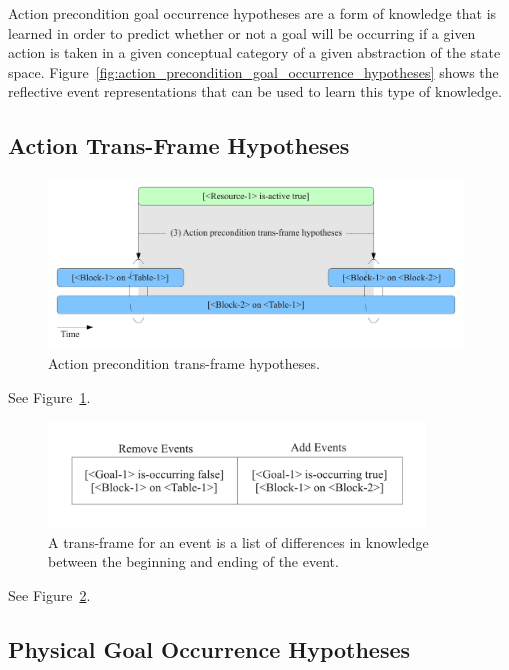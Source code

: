 Action precondition goal occurrence hypotheses are a form of knowledge
that is learned in order to predict whether or not a goal will be
occurring if a given action is taken in a given conceptual category of
a given abstraction of the state space.
Figure~\ref{fig:action_precondition_goal_occurrence_hypotheses} shows
the reflective event representations that can be used to learn this
type of knowledge.

\subsection{Action Trans-Frame Hypotheses}
\label{sec:learning_trans_frames_for_events}

\begin{figure}[bth]
  \center
  \includegraphics[width=11cm]{gfx/learning_to_plan-3-action_precondition_transframe_hypotheses}
  \caption[Action precondition trans-frame hypotheses]{Action precondition trans-frame hypotheses.}
  \label{fig:action_precondition_transframe_hypotheses}
\end{figure}

See Figure~\ref{fig:action_precondition_transframe_hypotheses}.

\begin{figure}[bth]
  \center
  \includegraphics[width=10cm]{gfx/transframe}
  \caption[A trans-frame for an event]{A trans-frame for an event is a
    list of differences in knowledge between the beginning and ending
    of the event.}
  \label{fig:transframe}
\end{figure}

See Figure~\ref{fig:transframe}.



\subsection{Physical Goal Occurrence Hypotheses}

